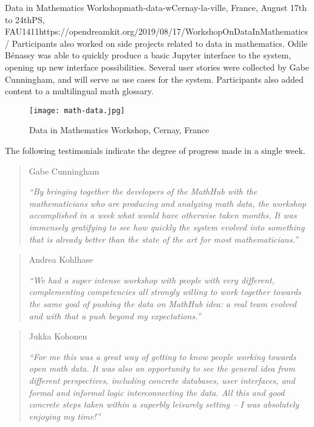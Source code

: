 \begin{event}{Data in Mathematics Workshop}{math-data-w}{Cernay-la-ville, France, August 17th to 24th}{PS, FAU}{14}{11}{https://opendreamkit.org/2019/08/17/WorkshopOnDataInMathematics/}
Participants also worked on side projects related to data in mathematics.
Odile Bénassy was able to quickly produce a basic Jupyter interface to the system,
opening up new interface possibilities.
Several user stories were collected by Gabe Cunningham, and will serve as use cases for the system.
Participants also added content to a multilingual math glossary.

\begin{figure}[ht]
  \texttt{[image: math-data.jpg]}
  \caption*{Data in Mathematics Workshop, Cernay, France}
\end{figure}

The following testimonials indicate the degree of progress made in a single week.

\begin{quote}
Gabe Cunningham

\emph{``By bringing together the developers of the MathHub with the mathematicians who are producing and analyzing math data, the workshop accomplished in a week what would have otherwise taken months. It was immensely gratifying to see how quickly the system evolved into something that is already better than the state of the art for most mathematicians.''}
\end{quote}
\vspace{5mm}

\begin{quote}
Andrea Kohlhase

\emph{``We had a super intense workshop with people with very different, complementing competencies all strongly willing to work together towards the same goal of pushing the data on MathHub idea: a real team evolved and with that a push beyond my expectations.''}
\end{quote}
\vspace{5mm}

\begin{quote}
Jukka Kohonen

\emph{``For me this was a great way of getting to know people working towards open math data. It was also an opportunity to see the general idea from different perspectives, including concrete databases, user interfaces, and formal and informal logic interconnecting the data. All this and good concrete steps taken within a superbly leisurely setting -- I was absolutely enjoying my time!''}
\end{quote}


\end{event}
